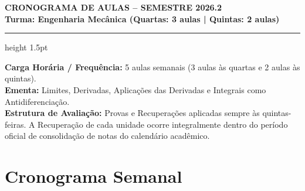 \documentclass[12pt,a4paper]{article}
\begin{document}
\begin{center}
  \vspace*{-0.3cm}
  {\Large\bfseries\color{primary} CRONOGRAMA DE AULAS -- SEMESTRE 2026.2} \\[0.15cm]
  {\large\bfseries\color{darkgrey} Turma: Engenharia Mecânica (Quartas: 3 aulas | Quintas: 2 aulas)}
  \vspace*{0.3cm}
  \hrule height 1.5pt \color{primary}
\end{center}

\vspace{0.2cm}

\noindent \textbf{Carga Horária / Frequência:} 5 aulas semanais (3 aulas às quartas e 2 aulas às quintas).\\
\textbf{Ementa:} Limites, Derivadas, Aplicações das Derivadas e Integrais como Antidiferenciação.\\
\textbf{Estrutura de Avaliação:} Provas e Recuperações aplicadas sempre às quintas-feiras. A Recuperação de cada unidade ocorre integralmente dentro do período oficial de consolidação de notas do calendário acadêmico.

\vspace{0.4cm}

\section*{Cronograma Semanal}
\end{document}
